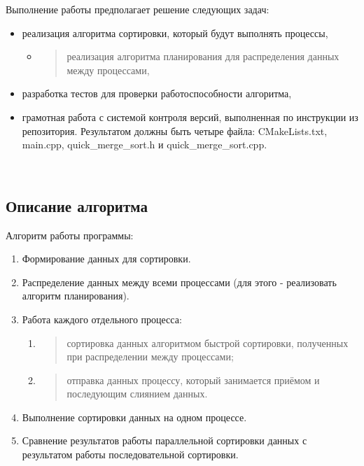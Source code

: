 \documentclass[]{article}
\begin{document}
Выполнение работы предполагает решение следующих задач:

\begin{itemize}
\item
  реализация алгоритма сортировки, который будут выполнять процессы,

  \begin{itemize}
  \item
    \begin{quote}
    реализация алгоритма планирования для распределения данных между
    процессами,
    \end{quote}
  \end{itemize}
\item
  разработка тестов для проверки работоспособности алгоритма,
\item
  грамотная работа с системой контроля версий, выполненная по инструкции
  из репозитория. Результатом должны быть четыре файла: CMakeLists.txt,
  main.cpp, quick\_merge\_sort.h и quick\_merge\_sort.cpp.

  \textbf{\\
  }
\end{itemize}

\subsection{\texorpdfstring{\textbf{Описание
алгоритма}}{Описание алгоритма}}\label{ux43eux43fux438ux441ux430ux43dux438ux435-ux430ux43bux433ux43eux440ux438ux442ux43cux430}

Алгоритм работы программы:

\begin{enumerate}
\def\labelenumi{\arabic{enumi}.}
\item
  Формирование данных для сортировки.
\item
  Распределение данных между всеми процессами (для этого - реализовать
  алгоритм планирования).
\item
  Работа каждого отдельного процесса:

  \begin{enumerate}
  \def\labelenumii{\alph{enumii}.}
  \item
    \begin{quote}
    сортировка данных алгоритмом быстрой сортировки, полученных при
    распределении между процессами;
    \end{quote}
  \item
    \begin{quote}
    отправка данных процессу, который занимается приёмом и последующим
    слиянием данных.
    \end{quote}
  \end{enumerate}
\item
  Выполнение сортировки данных на одном процессе.
\item
  Сравнение результатов работы параллельной сортировки данных с
  результатом работы последовательной сортировки.
\end{enumerate}
\end{document}
